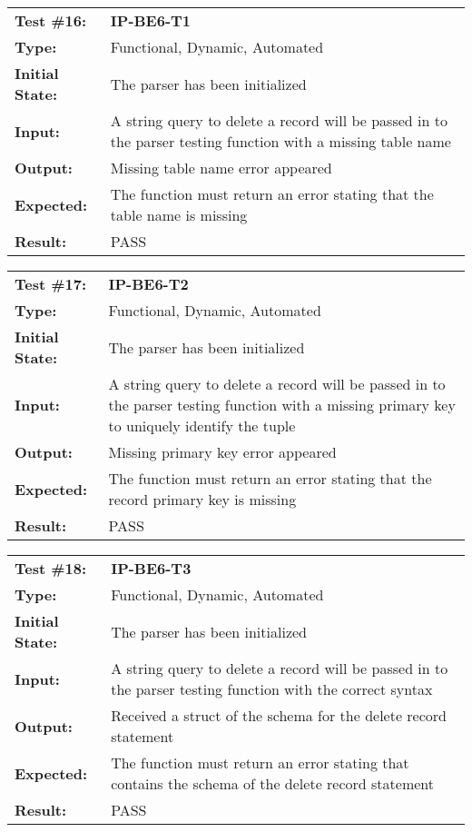\documentclass[12pt, titlepage]{article}
\begin{document}
\begin{mdframed}[linewidth=1pt]
\begin{tabularx}{\textwidth}{@{}p{3cm}X@{}}
{\bf Test \#16:} & {\bf IP-BE6-T1}\\[\baselineskip]
{\bf Type:} & Functional, Dynamic, Automated \\[0.5\baselineskip]
{\bf Initial State:} & The parser has been initialized \\[\baselineskip]
{\bf Input:} & A string query to delete a record will be passed in to the parser testing function with a missing table name \\[\baselineskip]
{\bf Output:} & Missing table name error appeared \\[\baselineskip]
{\bf Expected:} & The function must return an error stating that the table name is missing \\[\baselineskip]
{\bf Result:} & PASS
\end{tabularx}
\end{mdframed}

\begin{mdframed}[linewidth=1pt]
\begin{tabularx}{\textwidth}{@{}p{3cm}X@{}}
{\bf Test \#17:} & {\bf IP-BE6-T2}\\[\baselineskip]
{\bf Type:} & Functional, Dynamic, Automated \\[0.5\baselineskip]
{\bf Initial State:} & The parser has been initialized \\[\baselineskip]
{\bf Input:} & A string query to delete a record will be passed in to the parser testing function with a missing primary key to uniquely identify the tuple \\[\baselineskip]
{\bf Output:} & Missing primary key error appeared \\[\baselineskip]
{\bf Expected:} & The function must return an error stating that the record primary key is missing \\[\baselineskip]
{\bf Result:} & PASS
\end{tabularx}
\end{mdframed}

\begin{mdframed}[linewidth=1pt]
\begin{tabularx}{\textwidth}{@{}p{3cm}X@{}}
{\bf Test \#18:} & {\bf IP-BE6-T3}\\[\baselineskip]
{\bf Type:} & Functional, Dynamic, Automated \\[0.5\baselineskip]
{\bf Initial State:} & The parser has been initialized \\[\baselineskip]
{\bf Input:} & A string query to delete a record will be passed in to the parser testing function with the correct syntax \\[\baselineskip]
{\bf Output:} & Received a struct of the schema for the delete record statement \\[\baselineskip]
{\bf Expected:} & The function must return an error stating that contains the schema of the delete record statement \\[\baselineskip]
{\bf Result:} & PASS
\end{tabularx}
\end{mdframed}
\end{document}
